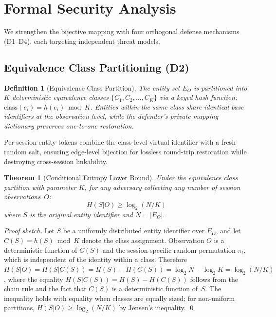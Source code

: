 \documentclass[11pt]{article}
\newtheorem{theorem}{Theorem}
\newtheorem{definition}{Definition}
\begin{document}
\section{Formal Security Analysis}
\label{sec:security}

We strengthen the bijective mapping with four orthogonal defense mechanisms (D1--D4), each targeting independent threat models.

\subsection{Equivalence Class Partitioning (D2)}

\begin{definition}[Equivalence Class Partition]
The entity set $E_O$ is partitioned into $K$ deterministic equivalence classes $\{C_1, C_2, \ldots, C_K\}$ via a keyed hash function: $\text{class}(e_i) = h(e_i) \bmod K$. Entities within the same class share identical base identifiers at the observation level, while the defender's private mapping dictionary preserves one-to-one restoration.
\end{definition}

Per-session entity tokens combine the class-level virtual identifier with a fresh random salt, ensuring edge-level bijection for lossless round-trip restoration while destroying cross-session linkability.

\begin{theorem}[Conditional Entropy Lower Bound]
Under the equivalence class partition with parameter $K$, for any adversary collecting any number of session observations~$O$:
\begin{equation}
H(S|O) \geq \log_2(N/K)
\end{equation}
where $S$ is the original entity identifier and $N = |E_O|$.
\end{theorem}

\begin{proof}[Proof sketch]
Let $S$ be a uniformly distributed entity identifier over $E_O$, and let $C(S) = h(S) \bmod K$ denote the class assignment. Observation $O$ is a deterministic function of $C(S)$ and the session-specific random permutation $\pi_t$, which is independent of the identity within a class. Therefore $H(S|O) = H(S|C(S)) = H(S) - H(C(S)) = \log_2 N - \log_2 K = \log_2(N/K)$, where the equality $H(S|C(S)) = H(S) - H(C(S))$ follows from the chain rule and the fact that $C(S)$ is a deterministic function of~$S$. The inequality holds with equality when classes are equally sized; for non-uniform partitions, $H(S|O) \geq \log_2(N/K)$ by Jensen's inequality. \qed
\end{proof}
\end{document}
